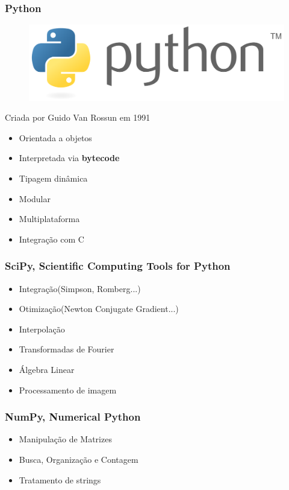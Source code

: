 \documentclass{beamer}
\begin{document}
\begin{frame}
    \frametitle{Python}
    \begin{figure}
        \includegraphics[width=.3\linewidth]{pylogo.png}
    \end{figure}   
    Criada por Guido Van Rossun em 1991
    \begin{itemize}
        \item Orientada a objetos
        \item Interpretada via \textbf{bytecode}
        \item Tipagem dinâmica
        \item Modular
        \item Multiplataforma
        \item Integração com C
    \end{itemize}
\end{frame}

\begin{frame}
    \frametitle{SciPy, Scientific Computing Tools for Python}
    \begin{itemize}
        \item Integração(Simpson, Romberg...)
        \item Otimização(Newton Conjugate Gradient...)
        \item Interpolação
        \item Transformadas de Fourier
        \item Álgebra Linear
        \item Processamento de imagem
    \end{itemize}
\end{frame}


\begin{frame}
    \frametitle{NumPy, Numerical Python}
    \begin{itemize}
        \item Manipulação de Matrizes
        \item Busca, Organização e Contagem
        \item Tratamento de strings
    \end{itemize}
\end{frame}
\end{document}
